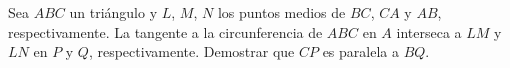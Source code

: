 Sea $ABC$ un triángulo y $L$, $M$, $N$ los puntos medios de $BC$, $CA$ y $AB$, respectivamente. La tangente a la circunferencia de $ABC$ en $A$ interseca a $LM$ y $LN$ en $P$ y $Q$, respectivamente. Demostrar que $CP$ es paralela a $BQ$.
